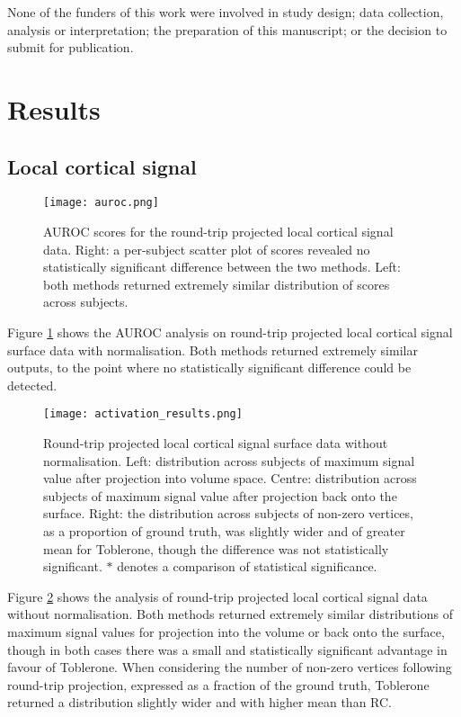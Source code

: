 \documentclass[review]{elsarticle}
\begin{document}
None of the funders of this work were involved in study design; data collection, analysis or interpretation; the preparation of this manuscript; or the decision to submit for publication. 

\section{Results}

\subsection{Local cortical signal}

\begin{figure}[H]
\centering
\texttt{[image: auroc.png]}
\caption{AUROC scores for the round-trip projected local cortical signal data. Right: a per-subject scatter plot of scores revealed no statistically significant difference between the two methods. Left: both methods returned extremely similar distribution of scores across subjects.}
\label{auroc}
\end{figure}

Figure \ref{auroc} shows the AUROC analysis on round-trip projected local cortical signal surface data with normalisation. Both methods returned extremely similar outputs, to the point where no statistically significant difference could be detected. 

\begin{figure}[H]
\centering
\texttt{[image: activation\_results.png]}
\caption{Round-trip projected local cortical signal surface data without normalisation. Left: distribution across subjects of maximum signal value after projection into volume space. Centre: distribution across subjects of maximum signal value after projection back onto the surface. Right: the distribution across subjects of non-zero vertices, as a proportion of ground truth, was slightly wider and of greater mean for Toblerone, though the difference was not statistically significant. $*$ denotes a comparison of statistical significance.}
\label{activation}
\end{figure}

Figure \ref{activation} shows the analysis of round-trip projected local cortical signal data without normalisation. Both methods returned extremely similar distributions of maximum signal values for projection into the volume or back onto the surface, though in both cases there was a small and statistically significant advantage in favour of Toblerone. When considering the number of non-zero vertices following round-trip projection, expressed as a fraction of the ground truth, Toblerone returned a distribution slightly wider and with higher mean than RC.
\end{document}
